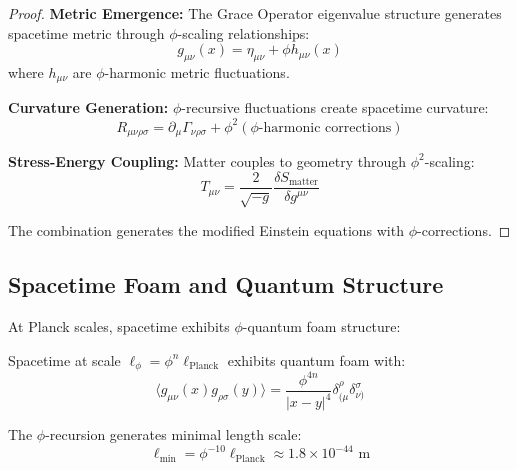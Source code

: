 \begin{proof}
\textbf{Metric Emergence:} The Grace Operator eigenvalue structure generates spacetime metric through $\phi$-scaling relationships:
\begin{equation}
g_{\mu\nu}(x) = \eta_{\mu\nu} + \phi h_{\mu\nu}(x)
\end{equation}
where $h_{\mu\nu}$ are $\phi$-harmonic metric fluctuations.

\textbf{Curvature Generation:} $\phi$-recursive fluctuations create spacetime curvature:
\begin{equation}
R_{\mu\nu\rho\sigma} = \partial_\mu \Gamma_{\nu\rho\sigma} + \phi^2 (\text{$\phi$-harmonic corrections})
\end{equation}

\textbf{Stress-Energy Coupling:} Matter couples to geometry through $\phi^2$-scaling:
\begin{equation}
T_{\mu\nu} = \frac{2}{\sqrt{-g}} \frac{\delta S_{\text{matter}}}{\delta g^{\mu\nu}}
\end{equation}

The combination generates the modified Einstein equations with $\phi$-corrections.
\end{proof}

\subsection{Spacetime Foam and Quantum Structure}

At Planck scales, spacetime exhibits $\phi$-quantum foam structure:

\begin{definition}
Spacetime at scale $\ell_\phi = \phi^n \ell_{\text{Planck}}$ exhibits quantum foam with:
\begin{equation}
\langle g_{\mu\nu}(x) g_{\rho\sigma}(y) \rangle = \frac{\phi^{4n}}{|x-y|^4} \delta_{(\mu}^\rho \delta_{\nu)}^\sigma
\label{eq:phi_foam_correlations}
\end{equation}
\end{definition}

\begin{theorem}
The $\phi$-recursion generates minimal length scale:
\begin{equation}
\ell_{\text{min}} = \phi^{-10} \ell_{\text{Planck}} \approx 1.8 \times 10^{-44} \text{ m}
\label{eq:phi_minimal_length}
\end{equation}
\end{theorem}

